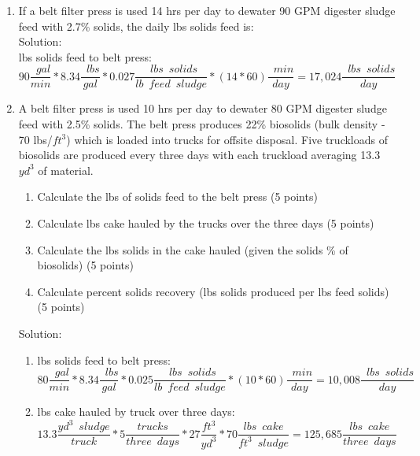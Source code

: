 \begin{enumerate}
\item If a belt filter press is used 14 hrs per day to dewater 90 GPM digester sludge feed with 2.7\% solids, the daily lbs solids feed is:\\
Solution:\\
lbs solids feed to belt press:\\
$90\dfrac{\enspace gal}{min}*8.34\dfrac{\enspace lbs}{gal}*
0.027\dfrac{\enspace lbs \enspace solids}{lb \enspace feed \enspace sludge}*(14*60)\dfrac{\enspace min}{day}=\boxed{17,024\dfrac{\enspace lbs \enspace solids}{day}}$\\


\item A belt filter press is used 10 hrs per day to dewater 80 GPM digester sludge feed with 2.5\% solids.  The belt press produces 22\% biosolids (bulk density - 70 lbs/$ft^3$) which is loaded into trucks for offsite disposal.  Five truckloads of biosolids are produced every three days with each truckload averaging 13.3 $yd^3$ of material.
\begin{enumerate}
\item Calculate the lbs of solids feed to the belt press (5 points)
\item Calculate lbs cake hauled by the trucks over the three days (5 points) 
\item Calculate the lbs solids in the cake hauled (given the solids \% of biosolids) (5 points) 
\item Calculate percent solids recovery (lbs solids produced per lbs feed solids) (5 points) 
\end{enumerate}

Solution:\\
\begin{enumerate}
\item lbs solids feed to belt press:\\
$80\dfrac{\enspace gal}{min}*8.34\dfrac{\enspace lbs}{gal}*
0.025\dfrac{\enspace lbs \enspace solids}{lb \enspace feed \enspace sludge}*(10*60)\dfrac{\enspace min}{day}=\boxed{10,008\dfrac{\enspace lbs \enspace solids}{day}}$\\
\item lbs cake hauled by truck over three days:\\
$
	13.3 
	\dfrac{yd^3 \enspace sludge}{truck}
	*
	5
	\dfrac{trucks}{three \enspace days}
	*
	27 
	\dfrac
	{
	ft^3
	}
	{
	yd^3
	}
	*
	70
	\dfrac
	{
	lbs \enspace cake
	}
	{ft^3 \enspace sludge
	}
	=\boxed
	{125,685 
	\dfrac{lbs \enspace cake}{three \enspace days}}
$


\end{enumerate}
\end{enumerate}
